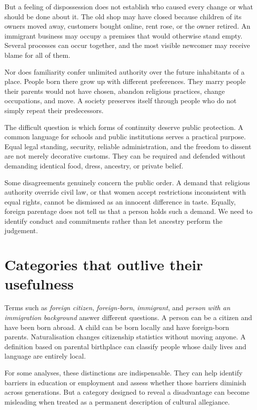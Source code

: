 \documentclass[12pt,a4paper]{book}
\begin{document}
But a feeling of dispossession does not establish who caused every change or what should be done about it. The old shop may have closed because children of its owners moved away, customers bought online, rent rose, or the owner retired. An immigrant business may occupy a premises that would otherwise stand empty. Several processes can occur together, and the most visible newcomer may receive blame for all of them.

Nor does familiarity confer unlimited authority over the future inhabitants of a place. People born there grow up with different preferences. They marry people their parents would not have chosen, abandon religious practices, change occupations, and move. A society preserves itself through people who do not simply repeat their predecessors.

The difficult question is which forms of continuity deserve public protection. A common language for schools and public institutions serves a practical purpose. Equal legal standing, security, reliable administration, and the freedom to dissent are not merely decorative customs. They can be required and defended without demanding identical food, dress, ancestry, or private belief.

Some disagreements genuinely concern the public order. A demand that religious authority override civil law, or that women accept restrictions inconsistent with equal rights, cannot be dismissed as an innocent difference in taste. Equally, foreign parentage does not tell us that a person holds such a demand. We need to identify conduct and commitments rather than let ancestry perform the judgement.

\section*{Categories that outlive their usefulness}

Terms such as \emph{foreign citizen}, \emph{foreign-born}, \emph{immigrant}, and \emph{person with an immigration background} answer different questions. A person can be a citizen and have been born abroad. A child can be born locally and have foreign-born parents. Naturalisation changes citizenship statistics without moving anyone. A definition based on parental birthplace can classify people whose daily lives and language are entirely local.

For some analyses, these distinctions are indispensable. They can help identify barriers in education or employment and assess whether those barriers diminish across generations. But a category designed to reveal a disadvantage can become misleading when treated as a permanent description of cultural allegiance.
\end{document}

